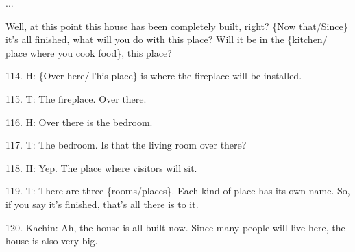 ...

Well, at this point this house has been completely built, right? \{Now that/Since\}
it's all finished, what will you do with this place?  Will it be in the \{kitchen/
place where you cook food\}, this place?

114. H: \{Over here/This place\} is where the fireplace will be installed.

115. T: The fireplace.  Over there.

116. H: Over there is the bedroom.

117. T: The bedroom.  Is that the living room over there?

118. H: Yep.  The place where visitors will sit.

119. T: There are three \{rooms/places\}.  Each kind of place has its own name.
So, if you say it's finished, that's all there is to it.

120. Kachin: Ah, the house is all built now.  Since many people will live here,
the house is also very big.


